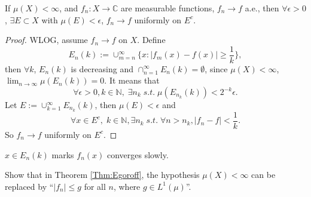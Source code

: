 \begin{thm}[Egoroff]
    \label{Thm:Egoroff}
    If $\mu(X)<\infty$, and $f_{n}:X\rightarrow\mathbb{C}$ are measurable 
    functions, $f_{n}\rightarrow f$ a.e., then 
    $\forall\epsilon>0$, $\exists E\subset X$ with $\mu(E)<\epsilon$, 
    $f_{n}\rightarrow f$ uniformly on $E^{c}$.
\end{thm}
\begin{proof}
    WLOG, assume $f_{n}\rightarrow f$ on $X$. Define 
    \begin{displaymath}
        E_{n}(k):=\cup_{m=n}^{\infty}\{x:|f_{m}(x)-f(x)|\ge\frac{1}{k}\},
    \end{displaymath}
    then $\forall k$, $E_{n}(k)$ is decreasing and 
    $\cap_{n=1}^{\infty}E_{n}(k)=\emptyset$, since $\mu(X)<\infty$, 
    $\lim_{n\rightarrow\infty}\mu(E_{n}(k))=0$. 
    It means that 
    \begin{displaymath}
        \forall\epsilon>0,k\in\mathbb{N},\;\exists n_{k}\; 
        s.t.\;\mu(E_{n_{k}}(k))<2^{-k}\epsilon.
    \end{displaymath}
    Let $E:=\cup_{k=1}^{\infty}E_{n_k}(k)$, then $\mu(E)<\epsilon$ 
    and 
    \begin{displaymath}
        \forall x\in E^{c},\;k\in\mathbb{N}, 
        \exists n_{k}\;s.t.\;\forall n>n_{k},
        |f_{n}-f|<\frac{1}{k}.
    \end{displaymath}
    So $f_{n}\rightarrow f$ uniformly on $E^{c}$.
\end{proof}
\begin{rem}
    $x\in E_{n}(k)$ marks $f_{n}(x)$ converges slowly.
\end{rem}
\begin{exc}
    Show that in Theorem \ref{Thm:Egoroff}, the hypothesis 
    $\mu(X)<\infty$ can be replaced by ``$|f_{n}|\le g$ for all 
    $n$, where $g\in L^{1}(\mu)$''.
\end{exc}
